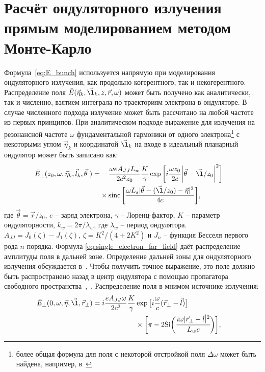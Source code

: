 \section{Расчёт ондуляторного излучения прямым моделированием методом Монте-Карло}
Формула~\ref{eq:E_bunch} используется напрямую при моделирования ондуляторного излучения, как продольно когерентного, так и некогерентного. Распределение поля $\bar{E}(\vec{\eta}_k, \vec{\l}_k, z, \vec{r}, \omega)$ может быть получено как аналитически, так и численно, взятием интеграла по траекториям электрона в ондуляторе. В случае численного подхода излучение может быть рассчитано на любой частоте из первых принципов. При аналитическом подходе выражение для излучения на резонансной частоте $\omega$ фундаментальной гармоники от одного электрона\footnote{более общая формула для поля с некоторой отстройкой поля $\Delta \omega$ может быть найдена, например, в~\cite{onuki_undulators_2003}} с некоторыми углом $\vec{\eta}_k$ и координатой $\vec{\l}_k$ на входе в идеальный планарный ондулятор может быть записано как: 
\begin{align}
	\bar{E}_{\bot}(z_0, \omega, \vec{\eta}_k, \vec{l}_k, \vec{\theta} \;) =
&	-\frac{\omega e A_{JJ} L_w}{2c^2z_0}\frac{K}{\gamma}\exp{\bigg[i \frac{\omega z_0}{2c} \bigg|\vec{\theta} - \vec{\l}/z_0\bigg|^2 \bigg]} \cr & \times \sinc \bigg[\frac{\omega L_s |\vec{\theta} - (\vec{\l}/z_0) - \vec{\eta}|^2}{4c}\bigg],
	\label{eq:single_electron_far_field}
\end{align}
где $\vec{\theta} = \vec{r}/z_0$, $e$ -- заряд электрона, $\gamma$ -- Лоренц-фактор, $K$ -- параметр ондуляторности, $k_w = 2 \pi / \lambda_w$, где $\lambda_w$ -- период ондулятора. $A_{JJ} = J_0(\zeta) - J_1(\zeta)$, $\zeta = K^2/(4 + 2K^2)$ и $J_n$ -- функция Бесселя первого рода $n$ порядка. Формула \ref{eq:single_electron_far_field} даёт распределение амплитуды поля в дальней зоне. Определение дальней зоны для ондуляторного излучения обсуждается в~\cite{geloni_fourier_2007}. Чтобы получить точное выражение, это поле должно быть распространено назад в центр ондулятора с помощью пропагатора свободного пространства~\cite{voelz_computational_2011},~\cite{schmidt_numerical_2010}. Распределение поля в мнимом источнике излучения:
\begin{align}
	\bar{E}_{\bot}(0, \omega, \vec{\eta}, \vec{\l}, \vec{r}_{\bot}) =
	i \frac{e A_{JJ} \omega}{2 c^2}\frac{K}{\gamma} &\exp{\big[i \frac{\omega}{c} (\vec{r}_{\bot} - \vec{l})\big]}\cr & \times \bigg [\pi - 2\text{Si} \bigg( \cfrac{i \omega |\vec{r}_{\bot} - \vec{l}|^2}{L_w c}\bigg)\bigg], 
	\label{eq:single_electron_near_field_z=0}
\end{align}
